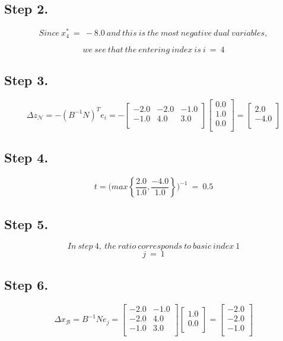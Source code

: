\documentclass [12pt] {article}
\begin{document}
\subsection{Step 2.}
\[
Since\ x_4^*\ = \ -8.0\ and\ this\ is\ the\ most\ negative\ dual\ variables,
\]

\[
we\ see\ that\ the\ entering\ index\ is\  i\ =\ 4
\]
\subsection{Step 3.}
\[
\Delta z_{\mathcal N}= -( B^{-1} N )^{T}e_i = -\begin{bmatrix}
-2.0 & -2.0 & -1.0 \\ -1.0 & 4.0 & 3.0 \\ 
\end{bmatrix}
\begin{bmatrix}
0.0 \\ 1.0 \\ 0.0 \\ 
\end{bmatrix}
= \begin{bmatrix}
2.0 \\ -4.0 \\ 
\end{bmatrix}
\]
\subsection{Step 4.}
\[
t =\Bigg(
max \left\{\frac{2.0}{1.0},\frac{-4.0}{1.0}\right\}
\Bigg)^{-1}\ =\ 0.5
\]
\subsection{Step 5.}
\[
In\ step\ 4, \ the\ ratio\ corresponds\ to\ basic\ index\ 1
\]
\[
j\ = \ 1
\]
\subsection{Step 6.}
\[
\Delta x_{\mathcal B} = B^{-1} N e_j =
\begin{bmatrix}
-2.0 & -1.0 \\ -2.0 & 4.0 \\ -1.0 & 3.0 \\ 
\end{bmatrix}
\begin{bmatrix}
1.0 \\ 0.0 \\ 
\end{bmatrix}
= \begin{bmatrix}
-2.0 \\ -2.0 \\ -1.0 \\ 
\end{bmatrix}
\]
\end{document}
